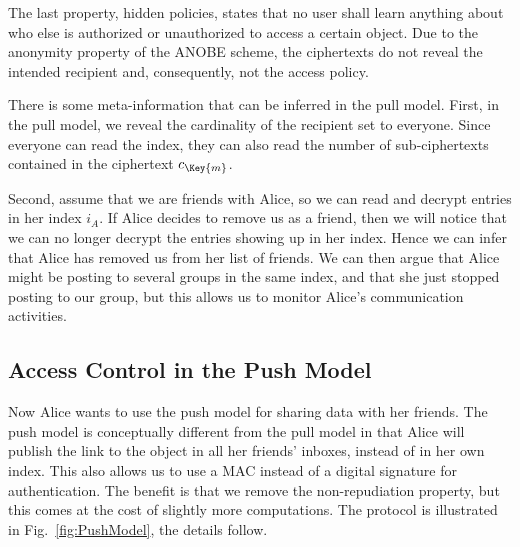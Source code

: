 The last property, hidden policies, states that no user shall learn anything 
about who else is authorized or unauthorized to access a certain object.
Due to the anonymity property of the \ac{ANOBE} scheme, the ciphertexts do not 
reveal the intended recipient and, consequently, not the access policy.

There is some meta-information that can be inferred in the pull model.
First, in the pull model, we reveal the cardinality of the recipient set to 
everyone.
Since everyone can read the index, they can also read the number of 
sub-ciphertexts contained in the ciphertext \(c_{\Key{m}}\).

Second, assume that we are friends with Alice, so we can read and decrypt 
entries in her index \(i_A\).
If Alice decides to remove us as a friend, then we will notice that we can no 
longer decrypt the entries showing up in her index.
Hence we can infer that Alice has removed us from her list of friends.
We can then argue that Alice might be posting to several groups in the same 
index, and that she just stopped posting to our group, but this allows us to 
monitor Alice's communication activities.

\subsection{Access Control in the Push Model}\label{sec:PushModelAC}

Now Alice wants to use the push model for sharing data with her friends.
The push model is conceptually different from the pull model in that Alice will 
publish the link to the object in all her friends' inboxes, instead of in her 
own index.
This also allows us to use a \ac{MAC} instead of a digital signature for 
authentication.
The benefit is that we remove the non-repudiation property, but this comes at 
the cost of slightly more computations.
The protocol is illustrated in Fig.~\ref{fig:PushModel}, the details follow.

